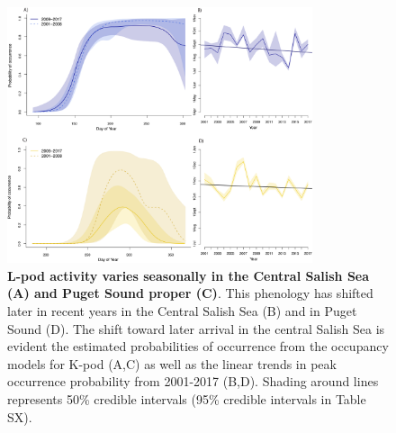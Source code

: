 \documentclass{article}
\begin{document}
\begin{figure}[p]
\includegraphics[width=0.8\textwidth]{../analyses/figures/proboccL_4panels.png} 
\caption{\textbf{L-pod activity varies seasonally in the Central Salish Sea (A) and Puget Sound proper (C)}. This phenology has shifted later in recent years in the Central Salish Sea (B) and in Puget Sound (D). The shift toward later arrival in the central Salish Sea is evident the estimated probabilities of occurrence from the occupancy models for K-pod (A,C) as well as the linear trends in peak occurrence probability from 2001-2017 (B,D). Shading around lines represents 50\% credible intervals (95\% credible intervals in Table SX). 
}
\label{fig:Lprobs}
\end{figure}

  
\end{document}
